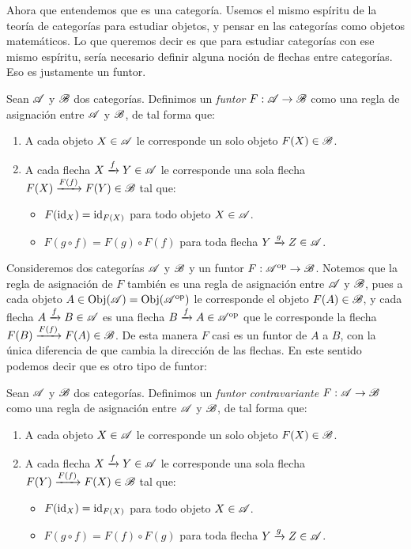 \documentclass{comunicaciones}
\begin{document}
Ahora que entendemos que es una categoría. Usemos el mismo espíritu de la teoría de categorías para estudiar objetos, y pensar en las categorías como objetos matemáticos.
Lo que queremos decir es que para estudiar categorías con ese mismo espíritu, sería necesario definir alguna noción de flechas entre categorías. 
Eso es justamente un funtor.

\begin{dfn}
    Sean $\mathscr A$ y $\mathscr B$ dos categorías. Definimos un \emph{funtor} $F:\mathscr A\to\mathscr B$ como una regla de asignación entre $\mathscr A$ y $\mathscr B$, de tal forma que:
    \begin{enumerate}
        \item A cada objeto $X\in\mathscr A$ le corresponde un solo objeto $F(X)\in\mathscr B$.
        \item A cada flecha $X\xrightarrow{f}Y\in\mathscr A$ le corresponde una sola flecha $F(X)\xrightarrow{F(f)}F(Y)\in\mathscr B$ tal que:
        \begin{itemize}
            \item $F(\mathrm{id}_X)=\mathrm{id}_{F(X)}$ para todo objeto $X\in\mathscr A$.
            \item $F(g\circ f)=F(g)\circ F(f)$ para toda flecha $Y\xrightarrow{g}Z\in\mathscr A$.
        \end{itemize}
    \end{enumerate}
\end{dfn}

Consideremos dos categorías $\mathscr A$ y $\mathscr B$ y un funtor $F:\mathscr A^{\mathrm{op}}\to\mathscr B$. Notemos que la regla de asignación de $F$ también es una regla de asignación entre $\mathscr A$ y $\mathscr B$,
pues a cada objeto $A\in\mathrm{Obj}(\mathscr A)=\mathrm{Obj}(\mathscr A^{\mathrm{op}})$ le corresponde el objeto $F(A)\in\mathscr B$, y cada flecha $A\xrightarrow{f}B\in\mathscr A$ es una flecha $B\xrightarrow{f}A\in\mathscr A^{\mathrm{op}}$ que le corresponde
la flecha $F(B)\xrightarrow{F(f)}F(A)\in\mathscr B$. De esta manera $F$ casi es un funtor de $A$ a $B$, con la única diferencia de que cambia la dirección de las flechas.
En este sentido podemos decir que es otro tipo de funtor:

\begin{dfn}
    Sean $\mathscr A$ y $\mathscr B$ dos categorías. Definimos un \emph{funtor contravariante} $F:\mathscr A\to\mathscr B$ como una regla de asignación entre $\mathscr A$ y $\mathscr B$, de tal forma que:
    \begin{enumerate}
        \item A cada objeto $X\in\mathscr A$ le corresponde un solo objeto $F(X)\in\mathscr B$.
        \item A cada flecha $X\xrightarrow{f}Y\in\mathscr A$ le corresponde una sola flecha $F(Y)\xrightarrow{F(f)}F(X)\in\mathscr B$ tal que:
        \begin{itemize}
            \item $F(\mathrm{id}_X)=\mathrm{id}_{F(X)}$ para todo objeto $X\in\mathscr A$.
            \item $F(g\circ f)=F(f)\circ F(g)$ para toda flecha $Y\xrightarrow{g}Z\in\mathscr A$.
        \end{itemize}
    \end{enumerate}
\end{dfn}
\end{document}
